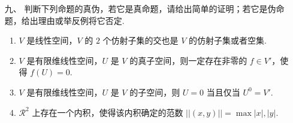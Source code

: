 \begin{enumerate}
    
    \item[九、]判断下列命题的真伪，若它是真命题，请给出简单的证明；若它是伪命题，给出理由或举反例将它否定.
    \begin{enumerate}[label=(\arabic*)]
        \item $V$ 是线性空间，$V$ 的 $2$ 个仿射子集的交也是 $V$ 的仿射子集或者空集.
        
        \item $V$ 是有限维线性空间，$U$ 是 $V$ 的真子空间，则一定存在非零的 $f \in V'$，使得 $f(U) = 0$.
        
        \item $V$ 是有限维线性空间，$U$ 是 $V$ 的子空间，则 $U = {0}$ 当且仅当 $U^{0} = V'$.
        
        \item $\mathcal{R}^{2}$ 上存在一个内积，使得该内积确定的范数 $||(x, y)|| = \max {|x|, |y|}$.
    \end{enumerate}
\end{enumerate}

\clearpage
